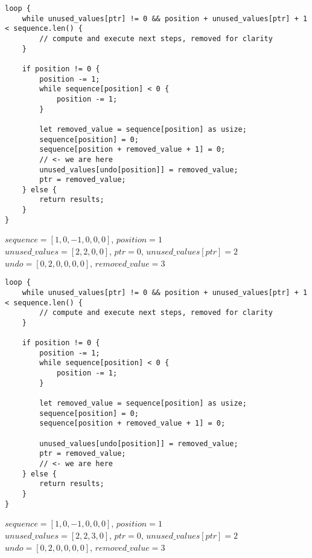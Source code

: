 \begin{frame}[fragile]
    \begin{verbatim}
loop {
    while unused_values[ptr] != 0 && position + unused_values[ptr] + 1 < sequence.len() {
        // compute and execute next steps, removed for clarity
    }
    
    if position != 0 {
        position -= 1;
        while sequence[position] < 0 {
            position -= 1;
        }
        
        let removed_value = sequence[position] as usize;
        sequence[position] = 0;
        sequence[position + removed_value + 1] = 0;
        // <- we are here
        unused_values[undo[position]] = removed_value;
        ptr = removed_value;
    } else {
        return results;
    }
}
    \end{verbatim}
    $sequence = [1, 0, -1, 0, 0, 0]$, $position = 1$\\
    $unused\_values = [2, 2, 0, 0]$, $ptr = 0$, $unused\_values[ptr] = 2$\\
    $undo = [0, 2, 0, 0, 0, 0]$, $removed\_value = 3$
\end{frame}
\begin{frame}[fragile]
    \begin{verbatim}
loop {
    while unused_values[ptr] != 0 && position + unused_values[ptr] + 1 < sequence.len() {
        // compute and execute next steps, removed for clarity
    }
    
    if position != 0 {
        position -= 1;
        while sequence[position] < 0 {
            position -= 1;
        }
        
        let removed_value = sequence[position] as usize;
        sequence[position] = 0;
        sequence[position + removed_value + 1] = 0;
        
        unused_values[undo[position]] = removed_value;
        ptr = removed_value;
        // <- we are here
    } else {
        return results;
    }
}
    \end{verbatim}
    $sequence = [1, 0, -1, 0, 0, 0]$, $position = 1$\\
    $unused\_values = [2, 2, 3, 0]$, $ptr = 0$, $unused\_values[ptr] = 2$\\
    $undo = [0, 2, 0, 0, 0, 0]$, $removed\_value = 3$
\end{frame}
